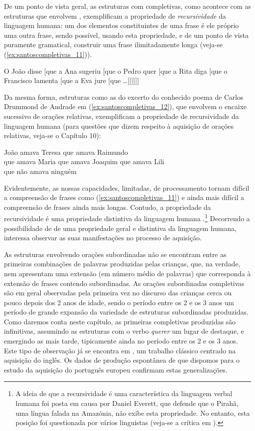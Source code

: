 \documentclass[output=paper]{LSP/langsci}
\begin{document}
De um ponto de vista geral, as estruturas com completivas, como acontece com as estruturas que envolvem , exemplificam a propriedade de \textit{recursividade} da linguagem humana: um dos elementos constituintes de uma frase é ele próprio uma outra frase, sendo possível, usando esta propriedade, e de um ponto de vista puramente gramatical, construir uma frase ilimitadamente longa (veja-se (\ref{ex:santoscompletivas_11})).

\ea\label{ex:santoscompletivas_11}
O João disse [que a Ana sugeriu [que o Pedro quer [que a Rita diga [que o Francisco lamenta [que a Eva jure [que \ldots]]]]]]
\z

Da mesma forma, estruturas como as do excerto do conhecido poema de Carlos Drummond de Andrade em (\ref{ex:santoscompletivas_12}), que envolvem o encaixe sucessivo de orações relativas, exemplificam a propriedade de recursividade da linguagem humana (para questões que dizem respeito à aquisição de orações relativas, veja-se o Capítulo 10):

\ea\label{ex:santoscompletivas_12}
João amava Teresa que amava Raimundo\\
que amava Maria que amava Joaquim que amava Lili\\
que não amava ninguém 
\z

Evidentemente, as nossas capacidades, limitadas, de processamento tornam difícil a compreensão de frases como (\ref{ex:santoscompletivas_11}) e ainda mais difícil a compreensão de frases ainda mais longas. Contudo, a propriedade da recursividade é uma propriedade distintiva da linguagem humana \citep{hauser_etal2010}.\footnote{A ideia de que a recursividade é uma característica da linguagem verbal humana foi posta em causa por Daniel Everett, que defende que o Pirahã, uma língua falada na Amazónia, não exibe esta propriedade. No entanto, esta posição foi questionada por vários linguistas (veja-se a crítica em \citealt{nevins_etal2009}).} Decorrendo a possibilidade de  de uma propriedade geral e distintiva da linguagem humana, interessa observar as suas manifestações no processo de aquisição.

As estruturas envolvendo orações subordinadas não se encontram entre as primeiras combinações de palavras produzidas pelas crianças, que, na verdade, nem apresentam uma extensão (em número médio de palavras) que corresponda à extensão de frases contendo subordinadas. As orações subordinadas completivas são em geral observadas pela primeira vez no discurso das crianças cerca ou pouco depois dos 2 anos de idade, sendo o período entre os 2 e os 3 anos um período de grande expansão da variedade de estruturas subordinadas produzidas. Como daremos conta neste capítulo, as primeiras completivas produzidas são infinitivas, assumindo as estruturas com o verbo \textit{querer} um lugar de destaque, e emergindo as  mais tarde, tipicamente ainda no período entre os 2 e os 3 anos. Este tipo de observação já se encontra em \citet{limber1973}, um trabalho clássico centrado na aquisição do inglês. Os dados de produção espontânea de que dispomos para o estudo da aquisição do português europeu confirmam estas generalizações.
\end{document}
